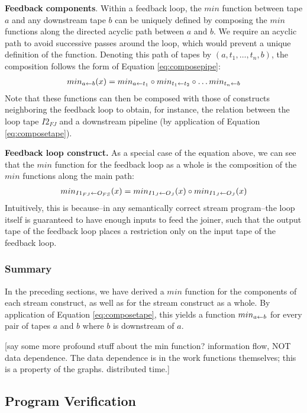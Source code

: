 {\bf Feedback components}.  Within a feedback loop, the $min$ function
between tape $a$ and any downstream tape $b$ can be uniquely defined
by composing the $min$ functions along the directed acyclic path
between $a$ and $b$.  We require an acyclic path to avoid successive
passes around the loop, which would prevent a unique definition of the
function.  Denoting this path of tapes by $(a, t_1, \dots , t_n, b)$,
the composition follows the form of Equation \ref{eq:composepipe}:
\begin{align*}
min_{a \leftarrow b}(x) = min_{a \leftarrow t_1} \circ min_{t_1 \leftarrow t_2} \circ \dots min_{t_n \leftarrow b}
\end{align*}
Note that these functions can then be composed with those of
constructs neighboring the feedback loop to obtain, for instance, the
relation between the loop tape $I2_{FJ}$ and a downstream pipeline (by
application of Equation \ref{eq:composetape}).

{\bf Feedback loop construct.}  As a special case of the equation
above, we can see that the $min$ function for the feedback loop as a
whole is the composition of the $min$ functions along the main path:
\begin{align*}
min_{I1_{FJ} \leftarrow O_{FS}}(x) = min_{I1_J \leftarrow O_J}(x) \circ min_{I1_J \leftarrow O_J}(x) 
\end{align*}
Intuitively, this is because--in any semantically correct stream
program--the loop itself is guaranteed to have enough inputs to feed
the joiner, such that the output tape of the feedback loop places a
restriction only on the input tape of the feedback loop.

\subsubsection{Summary}

In the preceding sections, we have derived a $min$ function for the
components of each stream construct, as well as for the stream
construct as a whole.  By application of Equation
\ref{eq:composetape}, this yields a function $min_{a \leftarrow b}$ for every
pair of tapes $a$ and $b$ where $b$ is downstream of $a$.

[say some more profound stuff about the min function?  information
  flow, NOT data dependence.  The data dependence is in the work
  functions themselves; this is a property of the graphs.  distributed
  time.]

\subsection{Program Verification}
\label{sec:prog-verif}

